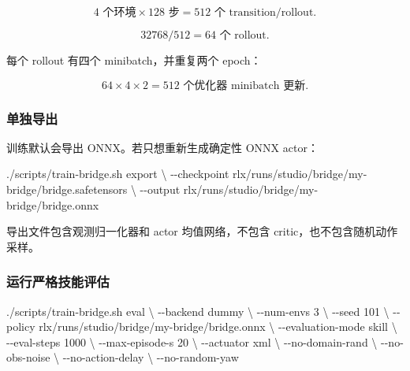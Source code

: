 \documentclass[
  chinese,
  11pt,
  letterpaper,
]{article}
\newenvironment{Shaded}{\begin{snugshade}}{\end{snugshade}}
\newcommand{\AttributeTok}[1]{\textcolor[rgb]{0.13,0.29,0.53}{#1}}
\newcommand{\DataTypeTok}[1]{\textcolor[rgb]{0.13,0.29,0.53}{#1}}
\newcommand{\ExtensionTok}[1]{#1}
\newcommand{\NormalTok}[1]{#1}
\renewenvironment{Shaded}{\par\smallskip}{\par\smallskip}
\begin{document}
\[
4\text{ 个环境}\times128\text{ 步}
=512\text{ 个 transition/rollout}.
\]

\[
32768/512=64\text{ 个 rollout}.
\]

每个 rollout 有四个 minibatch，并重复两个 epoch：

\[
64\times4\times2
=512\text{ 个优化器 minibatch 更新}.
\]

\subsubsection{单独导出}\label{ux5355ux72ecux5bfcux51fa}

训练默认会导出 ONNX。若只想重新生成确定性 ONNX actor：

\begin{Shaded}
\begin{Highlighting}[]
\ExtensionTok{./scripts/train{-}bridge.sh}\NormalTok{ export }\DataTypeTok{\textbackslash{}}
  \AttributeTok{{-}{-}checkpoint}\NormalTok{ rlx/runs/studio/bridge/my{-}bridge/bridge.safetensors }\DataTypeTok{\textbackslash{}}
  \AttributeTok{{-}{-}output}\NormalTok{ rlx/runs/studio/bridge/my{-}bridge/bridge.onnx}
\end{Highlighting}
\end{Shaded}

导出文件包含观测归一化器和 actor 均值网络，不包含
critic，也不包含随机动作采样。

\subsubsection{运行严格技能评估}\label{ux8fd0ux884cux4e25ux683cux6280ux80fdux8bc4ux4f30}

\begin{Shaded}
\begin{Highlighting}[]
\ExtensionTok{./scripts/train{-}bridge.sh}\NormalTok{ eval }\DataTypeTok{\textbackslash{}}
  \AttributeTok{{-}{-}backend}\NormalTok{ dummy }\DataTypeTok{\textbackslash{}}
  \AttributeTok{{-}{-}num{-}envs}\NormalTok{ 3 }\DataTypeTok{\textbackslash{}}
  \AttributeTok{{-}{-}seed}\NormalTok{ 101 }\DataTypeTok{\textbackslash{}}
  \AttributeTok{{-}{-}policy}\NormalTok{ rlx/runs/studio/bridge/my{-}bridge/bridge.onnx }\DataTypeTok{\textbackslash{}}
  \AttributeTok{{-}{-}evaluation{-}mode}\NormalTok{ skill }\DataTypeTok{\textbackslash{}}
  \AttributeTok{{-}{-}eval{-}steps}\NormalTok{ 1000 }\DataTypeTok{\textbackslash{}}
  \AttributeTok{{-}{-}max{-}episode{-}s}\NormalTok{ 20 }\DataTypeTok{\textbackslash{}}
  \AttributeTok{{-}{-}actuator}\NormalTok{ xml }\DataTypeTok{\textbackslash{}}
  \AttributeTok{{-}{-}no{-}domain{-}rand} \DataTypeTok{\textbackslash{}}
  \AttributeTok{{-}{-}no{-}obs{-}noise} \DataTypeTok{\textbackslash{}}
  \AttributeTok{{-}{-}no{-}action{-}delay} \DataTypeTok{\textbackslash{}}
  \AttributeTok{{-}{-}no{-}random{-}yaw}
\end{Highlighting}
\end{Shaded}
\end{document}
